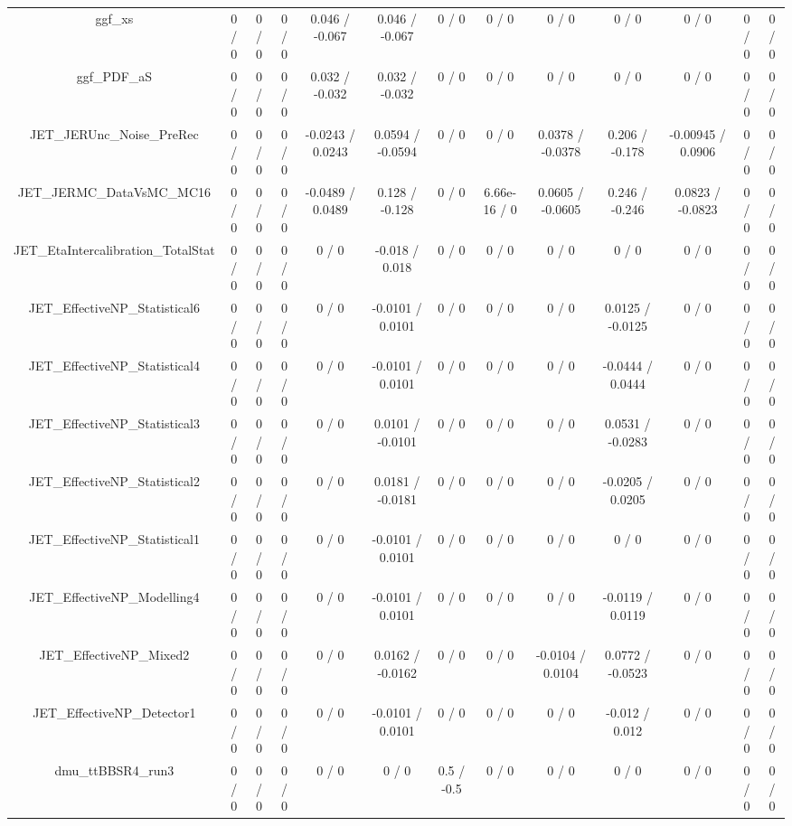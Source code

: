 \documentclass[10pt]{article}
\begin{document}
\begin{table}[htbp]
\begin{center}
\begin{tabular}{|c|c|c|c|c|c|c|c|c|c|c|c|c|}
  ggf_xs & 0 / 0 & 0 / 0 & 0 / 0 & 0.046 / -0.067 & 0.046 / -0.067 & 0 / 0 & 0 / 0 & 0 / 0 & 0 / 0 & 0 / 0 & 0 / 0 & 0 / 0 \\ 
  ggf_PDF_aS & 0 / 0 & 0 / 0 & 0 / 0 & 0.032 / -0.032 & 0.032 / -0.032 & 0 / 0 & 0 / 0 & 0 / 0 & 0 / 0 & 0 / 0 & 0 / 0 & 0 / 0 \\ 
  JET_JERUnc_Noise_PreRec & 0 / 0 & 0 / 0 & 0 / 0 & -0.0243 / 0.0243 & 0.0594 / -0.0594 & 0 / 0 & 0 / 0 & 0.0378 / -0.0378 & 0.206 / -0.178 & -0.00945 / 0.0906 & 0 / 0 & 0 / 0 \\ 
  JET_JERMC_DataVsMC_MC16 & 0 / 0 & 0 / 0 & 0 / 0 & -0.0489 / 0.0489 & 0.128 / -0.128 & 0 / 0 & 6.66e-16 / 0 & 0.0605 / -0.0605 & 0.246 / -0.246 & 0.0823 / -0.0823 & 0 / 0 & 0 / 0 \\ 
  JET_EtaIntercalibration_TotalStat & 0 / 0 & 0 / 0 & 0 / 0 & 0 / 0 & -0.018 / 0.018 & 0 / 0 & 0 / 0 & 0 / 0 & 0 / 0 & 0 / 0 & 0 / 0 & 0 / 0 \\ 
  JET_EffectiveNP_Statistical6 & 0 / 0 & 0 / 0 & 0 / 0 & 0 / 0 & -0.0101 / 0.0101 & 0 / 0 & 0 / 0 & 0 / 0 & 0.0125 / -0.0125 & 0 / 0 & 0 / 0 & 0 / 0 \\ 
  JET_EffectiveNP_Statistical4 & 0 / 0 & 0 / 0 & 0 / 0 & 0 / 0 & -0.0101 / 0.0101 & 0 / 0 & 0 / 0 & 0 / 0 & -0.0444 / 0.0444 & 0 / 0 & 0 / 0 & 0 / 0 \\ 
  JET_EffectiveNP_Statistical3 & 0 / 0 & 0 / 0 & 0 / 0 & 0 / 0 & 0.0101 / -0.0101 & 0 / 0 & 0 / 0 & 0 / 0 & 0.0531 / -0.0283 & 0 / 0 & 0 / 0 & 0 / 0 \\ 
  JET_EffectiveNP_Statistical2 & 0 / 0 & 0 / 0 & 0 / 0 & 0 / 0 & 0.0181 / -0.0181 & 0 / 0 & 0 / 0 & 0 / 0 & -0.0205 / 0.0205 & 0 / 0 & 0 / 0 & 0 / 0 \\ 
  JET_EffectiveNP_Statistical1 & 0 / 0 & 0 / 0 & 0 / 0 & 0 / 0 & -0.0101 / 0.0101 & 0 / 0 & 0 / 0 & 0 / 0 & 0 / 0 & 0 / 0 & 0 / 0 & 0 / 0 \\ 
  JET_EffectiveNP_Modelling4 & 0 / 0 & 0 / 0 & 0 / 0 & 0 / 0 & -0.0101 / 0.0101 & 0 / 0 & 0 / 0 & 0 / 0 & -0.0119 / 0.0119 & 0 / 0 & 0 / 0 & 0 / 0 \\ 
  JET_EffectiveNP_Mixed2 & 0 / 0 & 0 / 0 & 0 / 0 & 0 / 0 & 0.0162 / -0.0162 & 0 / 0 & 0 / 0 & -0.0104 / 0.0104 & 0.0772 / -0.0523 & 0 / 0 & 0 / 0 & 0 / 0 \\ 
  JET_EffectiveNP_Detector1 & 0 / 0 & 0 / 0 & 0 / 0 & 0 / 0 & -0.0101 / 0.0101 & 0 / 0 & 0 / 0 & 0 / 0 & -0.012 / 0.012 & 0 / 0 & 0 / 0 & 0 / 0 \\ 
  dmu_ttBBSR4_run3 & 0 / 0 & 0 / 0 & 0 / 0 & 0 / 0 & 0 / 0 & 0.5 / -0.5 & 0 / 0 & 0 / 0 & 0 / 0 & 0 / 0 & 0 / 0 & 0 / 0 \\ 

\end{tabular}
\end{center}
\end{table}
\end{document}
